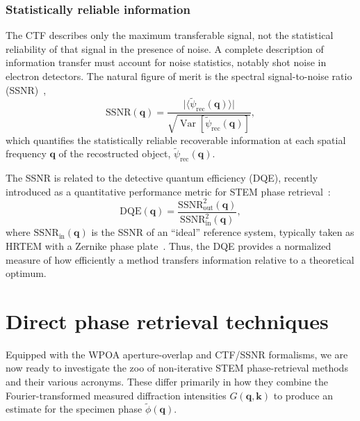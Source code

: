 \documentclass[pdflatex,sn-aps,iicol]{sn-jnl}%
\begin{document}
\subsubsection*{Statistically reliable information}

The CTF describes only the maximum transferable signal, not the statistical reliability of that signal in the presence of noise.
A complete description of information transfer must account for noise statistics, notably shot noise in electron detectors.
The natural figure of merit is the spectral signal-to-noise ratio (SSNR)~\cite{Unser_1987,Varnavides_2025_ssnr},
\begin{equation}
  \mathrm{SSNR}(\boldsymbol{q}) = \frac{\lvert \langle \tilde{\psi}_{\mathrm{rec}}(\boldsymbol{q}) \rangle \rvert} {\sqrt{\operatorname{Var}\!\left[\tilde{\psi}_{\mathrm{rec}}(\boldsymbol{q})\right]}},
  \label{eq:ssnr}
\end{equation}
which quantifies the statistically reliable recoverable information at each spatial frequency $\boldsymbol{q}$ of the recostructed object, $\tilde{\psi}_{\mathrm{rec}}(\boldsymbol{q})$.

The SSNR is related to the detective quantum efficiency (DQE), recently introduced as a quantitative performance metric for STEM phase retrieval~\cite{Bennemann_2025}:
\begin{equation}
  \mathrm{DQE}(\boldsymbol{q}) = \frac{\mathrm{SSNR}_{\text{out}}^{2}(\boldsymbol{q})} {\mathrm{SSNR}_{\text{in}}^{2}(\boldsymbol{q})},
  \label{eq:dqe}
\end{equation}
where $\mathrm{SSNR}_{\text{in}}(\boldsymbol{q})$ is the SSNR of an ``ideal'' reference system, typically taken as HRTEM with a Zernike phase plate~\cite{Zernike_1942,Vega_2025}.
Thus, the DQE provides a normalized measure of how efficiently a method transfers information relative to a theoretical optimum.

\section*{Direct phase retrieval techniques}

Equipped with the WPOA aperture-overlap and CTF/SSNR formalisms, we are now ready to investigate the zoo of non-iterative STEM phase-retrieval methods and their various acronyms.
These differ primarily in how they combine the Fourier-transformed measured diffraction intensities $G(\boldsymbol{q},\boldsymbol{k})$ to produce an estimate for the specimen phase $\tilde{\phi}(\boldsymbol{q})$.
\end{document}
